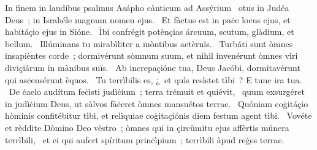 { In finem in laudibus psalmus Asápho cànticum ad Assýrium}
{%
~otus in Judéa Deus~; in Israhéle magnum nomen ejus. 
~Et fàctus est in paċe locus ejus, et habitáçio ejus in Sióne. 
~Ìbi confrégit potènçias árcuum, scutum, glàdium, et bellum. 
~Illúminans tu mirabìliter a mòntibus aetèrnïs. 
~Turbáti sunt òmnes insapièntes corde~; dormivérunt sòmnum suum, et nìhil invenérunt òmnes vìri diviçiárum in mànibus suïs. 
~Ab increpaçióne tua, Deus Jacóbi, dormitavérunt qui asċensérunt èquos. 
~Tu terrìbilis es, ¿~et quìs resìstet tìbi~? E tunc ira tua. 
~De ċaelo audítum feċìsti judìċium~; terra trémuit et quiévit, 
~quum exsurgéret in judìċium Deus, ut sàlvos fàċeret òmnes mansuétos terrae. 
~Quóniam coġitáçio hòminis confitébitur tìbi, et relìquiae coġitaçiónis diem festum agent tìbi. 
~Vovéte et rèddite Dòmino Deo vèstro~; òmnes qui in çircùmitu ejus affèrtis múnera terrìbili, 
~et ei qui aufert spíritum prinċìpium~; terrìbili àpud reġes terrae. 
}
